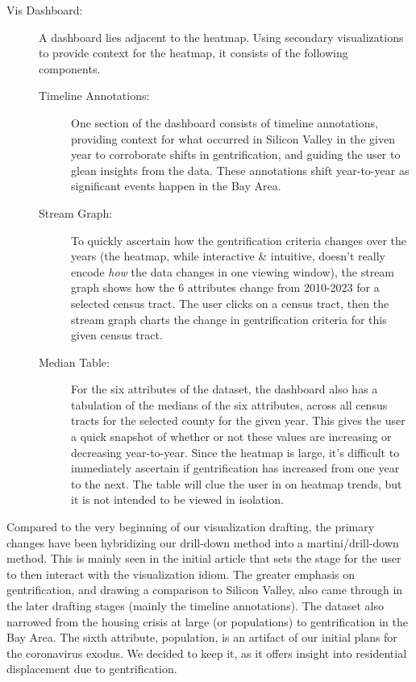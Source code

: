 \documentclass{article}
\begin{document}
\begin{description}
\begin{description}
        \item[Vis Dashboard:] A dashboard lies adjacent to the heatmap. Using secondary visualizations to provide context for the heatmap, it consists of the following components.
        
        \begin{description}
        
            \item[Timeline Annotations:] One section of the dashboard consists of timeline annotations, providing context for what occurred in Silicon Valley in the given year to corroborate shifts in gentrification, and guiding the user to glean insights from the data. These annotations shift year-to-year as significant events happen in the Bay Area.
            
            \item[Stream Graph:] To quickly ascertain how the gentrification criteria changes over the years (the heatmap, while interactive \& intuitive, doesn't really encode \textit{how} the data changes in one viewing window), the stream graph shows how the 6 attributes change from 2010-2023 for a selected census tract. The user clicks on a census tract, then the stream graph charts the change in gentrification criteria for this given census tract.
            
            \item[Median Table:] For the six attributes of the dataset, the dashboard also has a tabulation of the medians of the six attributes, across all census tracts for the selected county for the given year. This gives the user a quick snapshot of whether or not these values are increasing or decreasing year-to-year. Since the heatmap is large, it's difficult to immediately ascertain if gentrification has increased from one year to the next. The table will clue the user in on heatmap trends, but it is not intended to be viewed in isolation. 
            
        \end{description}
        
    \end{description}
    
\end{description}

    Compared to the very beginning of our visualization drafting, the primary changes have been hybridizing our drill-down method into a martini/drill-down method. This is mainly seen in the initial article that sets the stage for the user to then interact with the visualization idiom. The greater emphasis on gentrification, and drawing a comparison to Silicon Valley, also came through in the later drafting stages (mainly the timeline annotations). The dataset also narrowed from the housing crisis at large (or populations) to gentrification in the Bay Area. The sixth attribute, population, is an artifact of our initial plans for the coronavirus exodus. We decided to keep it, as it offers insight into residential displacement due to gentrification. 
    
\end{document}
